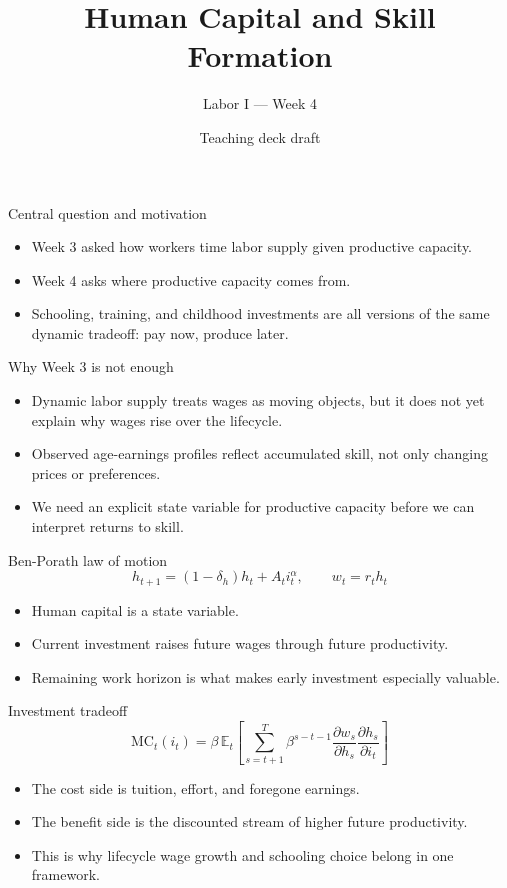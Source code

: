\documentclass[aspectratio=169,11pt]{beamer}
\title{Human Capital and Skill Formation}
\subtitle{Labor I --- Week 4}
\author{Teaching deck draft}
\date{}
\begin{document}
\begin{frame}
  \titlepage
\end{frame}

\begin{frame}{Central question and motivation}
\begin{itemize}
    \item Week 3 asked how workers time labor supply given productive capacity.
    \item Week 4 asks where productive capacity comes from.
    \item Schooling, training, and childhood investments are all versions of the same dynamic tradeoff: pay now, produce later.
\end{itemize}
\end{frame}

\begin{frame}{Why Week 3 is not enough}
\begin{itemize}
    \item Dynamic labor supply treats wages as moving objects, but it does not yet explain why wages rise over the lifecycle.
    \item Observed age-earnings profiles reflect accumulated skill, not only changing prices or preferences.
    \item We need an explicit state variable for productive capacity before we can interpret returns to skill.
\end{itemize}
\end{frame}

\begin{frame}{Ben-Porath law of motion}
\[
h_{t+1} = (1-\delta_h) h_t + A_t i_t^{\alpha},
\qquad
w_t = r_t h_t
\]

\begin{itemize}
    \item Human capital is a state variable.
    \item Current investment raises future wages through future productivity.
    \item Remaining work horizon is what makes early investment especially valuable.
\end{itemize}
\end{frame}

\begin{frame}{Investment tradeoff}
\[
\text{MC}_t(i_t)
=
\beta \, \mathbb{E}_t
\left[
\sum_{s=t+1}^{T}
\beta^{s-t-1}
\frac{\partial w_s}{\partial h_s}
\frac{\partial h_s}{\partial i_t}
\right]
\]

\begin{itemize}
    \item The cost side is tuition, effort, and foregone earnings.
    \item The benefit side is the discounted stream of higher future productivity.
    \item This is why lifecycle wage growth and schooling choice belong in one framework.
\end{itemize}
\end{frame}
\end{document}
